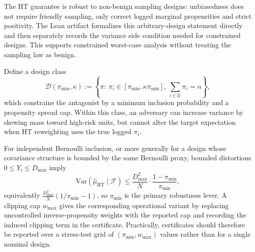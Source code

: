 The HT guarantee is robust to non-benign sampling designs: unbiasedness does not require friendly sampling, only correct logged marginal propensities and strict positivity. The Lean artifact formalizes this arbitrary-design statement directly and then separately records the variance side condition needed for constrained designs. This supports constrained worst-case analysis without treating the sampling law as benign.

Define a design class
\[
\mathcal{D}(\pi_{\min},\kappa)
:=\left\{\pi:\ \pi_i\in[\pi_{\min},\kappa\pi_{\min}],\ \sum_{i\in\mathcal{U}}\pi_i=n\right\},
\]
which constrains the antagonist by a minimum inclusion probability and a propensity spread cap. Within this class, an adversary can increase variance by skewing mass toward high-risk units, but cannot alter the target expectation when HT reweighting uses the true logged $\pi_i$.

For independent Bernoulli inclusion, or more generally for a design whose covariance structure is bounded by the same Bernoulli proxy, bounded distortions $0\le Y_i\le D_{\max}$ imply
\[
\mathrm{Var}\!\left(\hat{\mu}_{\mathrm{HT}}\mid\mathcal{F}\right)
\le
\frac{D_{\max}^2}{N}\cdot \frac{1-\pi_{\min}}{\pi_{\min}},
\]
equivalently $\frac{D_{\max}^2}{N}(1/\pi_{\min}-1)$, so $\pi_{\min}$ is the primary robustness lever. A clipping cap $w_{\max}$ gives the corresponding operational variant by replacing uncontrolled inverse-propensity weights with the reported cap and recording the induced clipping term in the certificate. Practically, certificates should therefore be reported over a stress-test grid of $(\pi_{\min}, w_{\max})$ values rather than for a single nominal design.
